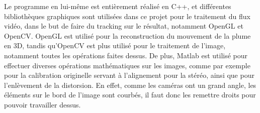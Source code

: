 
Le programme en lui-même est entièrement réalisé en C++, et différentes bibliothèques graphiques sont utilisées dans ce projet pour le traitement du flux vidéo, dans le but de faire du tracking sur le résultat, notamment OpenGL et OpenCV. OpenGL est utilisé pour la reconstruction du mouvement de la plume en 3D, tandis qu'OpenCV est plus utilisé pour le traitement de l'image, notamment toutes les opérations faites dessus. De plus, Matlab est utilisé pour effectuer diverses opérations mathématiques sur les images, comme par exemple pour la calibration originelle servant à l'alignement pour la stéréo, ainsi que pour l'enlèvement de la distorsion. En effet, comme les caméras ont un grand angle, les éléments sur le bord de l'image sont courbés, il faut donc les remettre droits pour pouvoir travailler dessus.